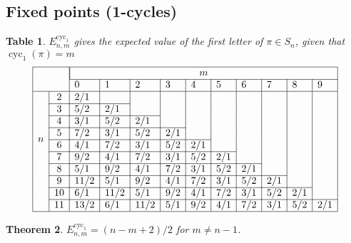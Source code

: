 \documentclass{article}
\newcommand{\n}[1]{\multicolumn{1}{|c|}{#1}}
\newtheorem{theo}{Theorem}[subsection]
\newtheorem{datatable}[theo]{Table}
\begin{document}
\subsection{Fixed points (1-cycles)}
\begin{datatable} $E_{n,m}^{\text{cyc}_1}$ gives the expected value of the first letter of
  $\pi \in S_n$, given that $\operatorname{cyc}_1(\pi) = m$
\[
  \begin{array}{|ll|l|l|l|l|l|l|l|l|l|l|}
  \hline
  & & \multicolumn{10}{|c|}{m} \\
  \cline{3-12}
  & & 0 & 1 & 2 & 3 & 4 & 5 & 6 & 7 & 8 & 9\\
  \hline
  \multirow{8}{*}{$n$}
  & \n{2}  & 2/1  &      &      &     &     &     &     &     &     &     \\ \cline{2-4}
  & \n{3}  & 5/2  & 2/1  &      &     &     &     &     &     &     &     \\ \cline{2-5}
  & \n{4}  & 3/1  & 5/2  & 2/1  &     &     &     &     &     &     &     \\ \cline{2-6}
  & \n{5}  & 7/2  & 3/1  & 5/2  & 2/1 &     &     &     &     &     &     \\ \cline{2-7}
  & \n{6}  & 4/1  & 7/2  & 3/1  & 5/2 & 2/1 &     &     &     &     &     \\ \cline{2-8}
  & \n{7}  & 9/2  & 4/1  & 7/2  & 3/1 & 5/2 & 2/1 &     &     &     &     \\ \cline{2-9}
  & \n{8}  & 5/1  & 9/2  & 4/1  & 7/2 & 3/1 & 5/2 & 2/1 &     &     &     \\ \cline{2-10}
  & \n{9}  & 11/2 & 5/1  & 9/2  & 4/1 & 7/2 & 3/1 & 5/2 & 2/1 &     &     \\ \cline{2-11}
  & \n{10} & 6/1  & 11/2 & 5/1  & 9/2 & 4/1 & 7/2 & 3/1 & 5/2 & 2/1 &     \\ \cline{2-12}
  & \n{11} & 13/2 & 6/1  & 11/2 & 5/1 & 9/2 & 4/1 & 7/2 & 3/1 & 5/2 & 2/1 \\
  \hline
  \end{array}
\]
\end{datatable}
\begin{theo}
  $E_{n,m}^{\text{cyc}_1} = (n - m + 2)/2$ for $m \neq n - 1$.
\end{theo}
\end{document}
